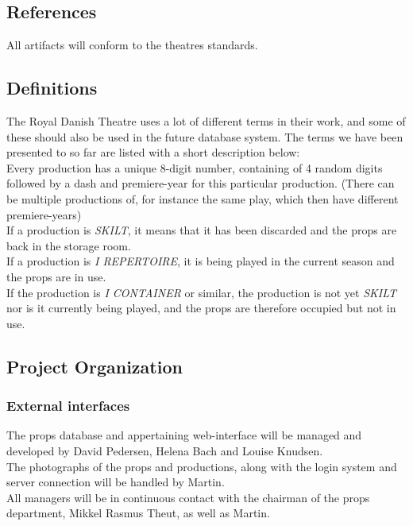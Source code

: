 \documentclass[12pt]{article}
\begin{document}
\subsection{References}
All artifacts will conform to the theatres standards.
\subsection{Definitions}
The Royal Danish Theatre uses a lot of different terms in their work, and some of these should also be used in the future database system. The terms we have been presented to so far are listed with a short description below: \\
Every production has a unique 8-digit number, containing of 4 random digits followed by a dash and premiere-year for this particular production. (There can be multiple productions of, for instance the same play, which then have different premiere-years) \\
If a production is \textit{SKILT}, it means that it has been discarded and the props are back in the storage room. \\
If a production is \textit{I REPERTOIRE}, it is being played in the current season and the props are in use. \\
If the production is \textit{I CONTAINER} or similar, the production is not yet \textit{SKILT} nor is it currently being played, and the props are therefore occupied but not in use.
\subsection{Project Organization}
\subsubsection{External interfaces}
The props database and appertaining web-interface will be managed and developed by David Pedersen, Helena Bach and Louise Knudsen. \\
The photographs of the props and productions, along with the login system and server connection will be handled by Martin. \\
All managers will be in continuous contact with the chairman of the props department, Mikkel Rasmus Theut, as well as Martin. 
\end{document}
